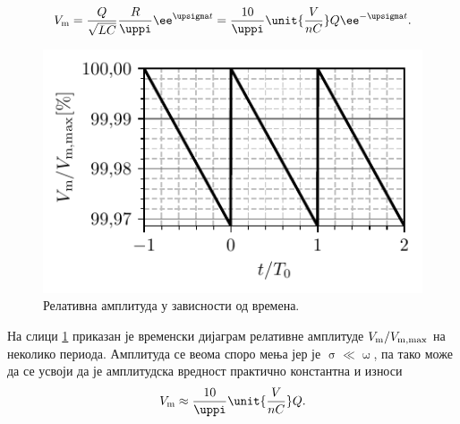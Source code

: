 \begin{equation}
    V_{\rm m} = 
    \dfrac{Q}{\sqrt{LC}} 
    \dfrac{R}{\uppi} \ee^{\upsigma t} 
    = \dfrac{10}{\uppi} \unit{\dfrac{V}{nC}} Q \ee^{-\upsigma t}.
\end{equation}
%
\begin{figure}[ht!]
    \centering
    \includegraphics{fig/comb_RLC_ss.pdf}
    \caption{Релативна амплитуда у зависности од времена.}
    \label{fig:\ID.final}
\end{figure}
%
На слици \ref{fig:\ID.final} приказан је временски дијаграм релативне амплитуде 
$V_{\rm m}/V_{\rm m, max}$ на неколико периода. Амплитуда се веома споро мења јер је $\upsigma \ll \upomega$, 
па тако може да се усвоји да је амплитудска вредност практично константна и износи 
\begin{eqnarray}
    V_{\rm m} \approx \dfrac{10}{\uppi} \unit{\dfrac{V}{nC}} Q.
\end{eqnarray}

